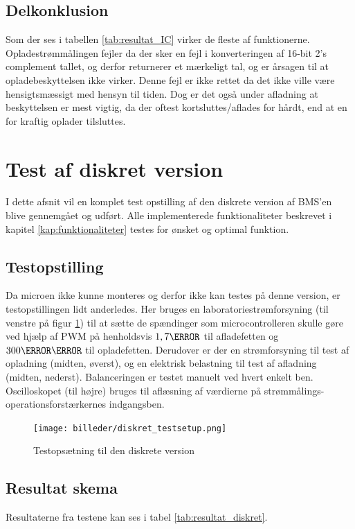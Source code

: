 \subsection{Delkonklusion}
Som der ses i tabellen \ref{tab:resultat_IC} virker de fleste af funktionerne. Opladestrømmålingen fejler da der sker en fejl i konverteringen af 16-bit 2's complement tallet, og derfor returnerer et mærkeligt tal, og er årsagen til at opladebeskyttelsen ikke virker. Denne fejl er ikke rettet da det ikke ville være hensigtsmæssigt med hensyn til tiden. Dog er det også under afladning at beskyttelsen er mest vigtig, da der oftest kortsluttes/aflades for hårdt, end at en for kraftig oplader tilsluttes.

\section{Test af diskret version}\label{afs:test_diskret}
I dette afsnit vil en komplet test opstilling af den diskrete version af BMS'en blive gennemgået og udført. Alle implementerede funktionaliteter beskrevet i kapitel \ref{kap:funktionaliteter} testes for ønsket og optimal funktion. 

\subsection{Testopstilling}
Da microen ikke kunne monteres og derfor ikke kan testes på denne version, er testopstillingen lidt anderledes. Her bruges en laboratoriestrømforsyning (til venstre på figur \ref{fig:diskret_testsetup}) til at sætte de spændinger som microcontrolleren skulle gøre ved hjælp af PWM på henholdsvis $1,7\volt$ til afladefetten og $300\milli\volt$ til opladefetten. Derudover er der en strømforsyning til test af opladning (midten, øverst), og en elektrisk belastning til test af afladning (midten, nederst). Balanceringen er testet manuelt ved hvert enkelt ben. Oscilloskopet (til højre) bruges til aflæsning af værdierne på strømmålings-operationsforstærkernes indgangsben.

\begin{figure}[h]
	\centering
	\texttt{[image: billeder/diskret\_testsetup.png]}
	\caption{Testopsætning til den diskrete version}
	\label{fig:diskret_testsetup}
\end{figure}

\subsection{Resultat skema}
Resultaterne fra testene kan ses i tabel \ref{tab:resultat_diskret}.


